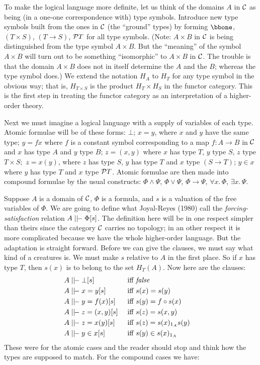 To make the logical language more definite, let us think of the domains $A$ in $\C$ as being (in a one-one correspondence with) type symbols. Introduce new type symbols built from the ones
in $\C$ (the ``ground'' types) by forming $\bbone$, $(T \times S)$, $(T\to S)$, $\P T$ for all type symbols. (Note: $A \times B$ in $\C$ is being distinguished
from the type symbol $A \times B$. But the ``meaning'' of the symbol
$A\times B$ will turn out to be something ``isomorphic'' to $A\times B$ in $\C$. The trouble is that the domain $A \times B$ does not in itself determine the $A$ and the $B$; whereas the type symbol does.) We extend the notation $H_A$ to $H_T$ for any type symbol in the obvious way;
that is, $H_{T \times S}$ is the product $H_T \times H_S$ in the functor category. This is the first step in treating the functor category as an interpretation of a higher-order theory.

Next we must imagine a logical language with a supply of variables of each type. Atomic formulae will be of these
forms: $\bot$; $x = y$, where $x$ and $y$ have the same type; $y = f x$
where $f$ is a constant symbol corresponding to a map $f: A \to B$ in $\C$ and $x$ has type $A$ and $y$ type $B$; $z = (x,y)$ where $x$ has type $T$, $y$ type $S$, $z$ type $T \times S;$ $z = x(y)$, where $z$ has type $S$, $y$ has type $T$ and $x$ type $(S \to T)$; $y \in x$ where $y$ has type $T$ and $x$ type $\P T$. Atomic formulae are then made into compound formulae by the usual constructs: $\Phi \land \Psi$, $\Phi \lor \Psi$, $\Phi \to \Psi$, $\forall x. \, \Phi$, $\exists x. \, \Psi$.


Suppose $A$ is a domain of $\C$, $\Phi$ is a formula, and $s$ is a valuation of the free variables of $\Phi$. We are going to define what Joyal-Reyes (1980) call the {\it forcing-satisfaction} relation $A \mm \Phi[s]$. The definition here will be in one respect simpler
than theirs since the category $\C$ carries no topology; in an other respect it is more complicated because we have the whole higher-order language. But the adaptation is straight forward. Before we can give the clauses, we must say what kind of a creatures is. We must make $s$ relative to $A$ in the first place. So if $x$ has type $T$, then $s(x)$ is to belong to the set $H_T(A)$. Now here are the clauses:
\begin{align*}
  A & \mm \bot [s] & {\textrm{ iff }} & {\mathit { false }} &\\
  A & \mm x = y  [s] & {\textrm{ iff }} & s(x) = s(y) &\\
  A & \mm y = f(x) [s] & {\textrm{ iff }} & s(y) = f \comp s(x) &\\
  A & \mm z = (x,y) [s] & {\textrm{ iff }} & s(z) = s(x,y) &\\
  A & \mm z = x(y) [s] & {\textrm{ iff }} & s(z) = s(x)_{\id_A} s(y) &\\
  A & \mm y \in x [s] & {\textrm{ iff }} & s(y) \in s(x)_{\id_A} &\\
\end{align*}
These were for the atomic cases and the reader should stop and think how the types are supposed to match. For the compound cases we have:

